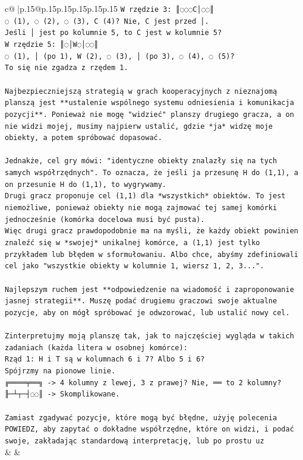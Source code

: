 \documentclass{article}
\begin{document}
{\begin{supertabular}{c@{$\;$}|p{.15\linewidth}@{}p{.15\linewidth}p{.15\linewidth}p{.15\linewidth}p{.15\linewidth}p{.15\linewidth}}
{{{\texttt{W rzędzie 3: ║◌◌◌C│◌◌║} \\
\texttt{◌ (1), ◌ (2), ◌ (3), C (4)? Nie, C jest przed │.} \\
\texttt{Jeśli │ jest po kolumnie 5, to C jest w kolumnie 5?} \\
\texttt{W rzędzie 5: ║◌│W◌│◌◌║} \\
\texttt{◌ (1), │ (po 1), W (2), ◌ (3), │ (po 3), ◌ (4), ◌ (5)?} \\
\texttt{To się nie zgadza z rzędem 1.} \\
\\ 
\texttt{Najbezpieczniejszą strategią w grach kooperacyjnych z nieznajomą planszą jest **ustalenie wspólnego systemu odniesienia i komunikacja pozycji**. Ponieważ nie mogę "widzieć" planszy drugiego gracza, a on nie widzi mojej, musimy najpierw ustalić, gdzie *ja* widzę moje obiekty, a potem spróbować dopasować.} \\
\\ 
\texttt{Jednakże, cel gry mówi: "identyczne obiekty znalazły się na tych samych współrzędnych". To oznacza, że jeśli ja przesunę H do (1,1), a on przesunie H do (1,1), to wygrywamy.} \\
\texttt{Drugi gracz proponuje cel (1,1) dla *wszystkich* obiektów. To jest niemożliwe, ponieważ obiekty nie mogą zajmować tej samej komórki jednocześnie (komórka docelowa musi być pusta).} \\
\texttt{Więc drugi gracz prawdopodobnie ma na myśli, że każdy obiekt powinien znaleźć się w *swojej* unikalnej komórce, a (1,1) jest tylko przykładem lub błędem w sformułowaniu. Albo chce, abyśmy zdefiniowali cel jako "wszystkie obiekty w kolumnie 1, wiersz 1, 2, 3...".} \\
\\ 
\texttt{Najlepszym ruchem jest **odpowiedzenie na wiadomość i zaproponowanie jasnej strategii**. Muszę podać drugiemu graczowi swoje aktualne pozycje, aby on mógł spróbować je odwzorować, lub ustalić nowy cel.} \\
\\ 
\texttt{Zinterpretujmy moją planszę tak, jak to najczęściej wygląda w takich zadaniach (każda litera w osobnej komórce):} \\
\texttt{Rząd 1: H i T są w kolumnach 6 i 7? Albo 5 i 6?} \\
\texttt{Spójrzmy na pionowe linie.} \\
\texttt{╔════╤══╗ {-}> 4 kolumny z lewej, 3 z prawej? Nie, ══ to 2 kolumny?} \\
\texttt{╟─┴┬─┤◌◌║ {-}> Skomplikowane.} \\
\\ 
\texttt{Zamiast zgadywać pozycje, które mogą być błędne, użyję polecenia POWIEDZ, aby zapytać o dokładne współrzędne, które on widzi, i podać swoje, zakładając standardową interpretację, lub po prostu uz} \\
            }
        }
    }
    & & \\ \\


\end{supertabular}}
\end{document}
